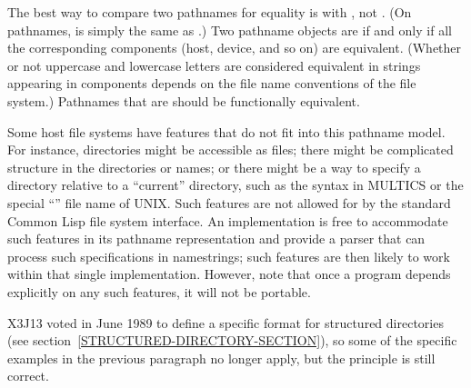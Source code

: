 
The best way to compare two pathnames for equality is with ,
not .
(On pathnames,  is simply the same as .)
Two pathname objects are  if and only if
all the corresponding components
(host, device, and so on) are equivalent.  (Whether or not
uppercase and lowercase letters are considered equivalent
in strings appearing in components depends on the file
name conventions of the file system.)  Pathnames
that are  should be functionally equivalent.

\begin{obsolete}
Some host file systems have features that do not fit into this pathname
model.  For instance, directories might be accessible as files; there
might be complicated structure in the directories or names; or there
might be a way to specify a directory relative to a
``current'' directory, such as the \cdf{<} syntax in
{MULTICS} or the special ``'' file name of {UNIX}.  Such
features are not allowed for by the standard Common Lisp file system
interface.  An implementation is free to accommodate such features in its
pathname representation and provide a parser that can process such
specifications in namestrings; such features are then likely to work
within that single implementation.  However, note that once a program
depends explicitly on any such features, it will not be portable.
\end{obsolete}
\begin{newer}
X3J13 voted in June 1989 
to define a specific format for structured directories
(see section~\ref{STRUCTURED-DIRECTORY-SECTION}), so some of the specific
examples in the previous paragraph no longer apply, but the principle is
still correct.
\end{newer}

